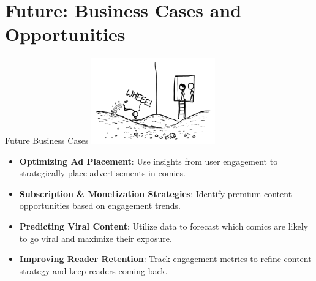 \documentclass{beamer}
\begin{document}
\section{Future: Business Cases and Opportunities}
\begin{frame}{Future Business Cases}
    \centering
    \includegraphics[width=0.4\textwidth]{../screenshots/scrooge.png}
    \begin{itemize}
        \item \textbf{Optimizing Ad Placement}: Use insights from user engagement to strategically place advertisements in comics.
        \item \textbf{Subscription \& Monetization Strategies}: Identify premium content opportunities based on engagement trends.
        \item \textbf{Predicting Viral Content}: Utilize data to forecast which comics are likely to go viral and maximize their exposure.
        \item \textbf{Improving Reader Retention}: Track engagement metrics to refine content strategy and keep readers coming back.
    \end{itemize}
\end{frame}
\end{document}
